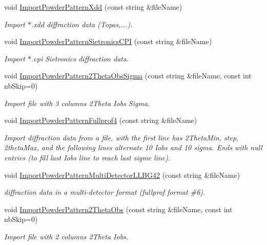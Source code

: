 \begin{DoxyCompactItemize}
void \mbox{\hyperlink{class_obj_cryst_1_1_powder_pattern_a4a8e1dc893c04a4451327d3f48f21d0e}{Import\+Powder\+Pattern\+Xdd}} (const string \&file\+Name)
\begin{DoxyCompactList}\small\item\em Import $\ast$.xdd diffraction data (Topas,...). \end{DoxyCompactList}\item 
void \mbox{\hyperlink{class_obj_cryst_1_1_powder_pattern_adabe6381d8d1189abcf420f69a41cc81}{Import\+Powder\+Pattern\+Sietronics\+C\+PI}} (const string \&file\+Name)
\begin{DoxyCompactList}\small\item\em Import $\ast$.cpi Sietronics diffraction data. \end{DoxyCompactList}\item 
void \mbox{\hyperlink{class_obj_cryst_1_1_powder_pattern_aee56a2f23b8af5c855ceae82c246f242}{Import\+Powder\+Pattern2\+Theta\+Obs\+Sigma}} (const string \&file\+Name, const int nb\+Skip=0)
\begin{DoxyCompactList}\small\item\em Import file with 3 columns 2Theta Iobs Sigma. \end{DoxyCompactList}\item 
void \mbox{\hyperlink{class_obj_cryst_1_1_powder_pattern_a272b9fd71a6925eb9e1a991e488259b4}{Import\+Powder\+Pattern\+Fullprof4}} (const string \&file\+Name)
\begin{DoxyCompactList}\small\item\em Import diffraction data from a file, with the first line has 2Theta\+Min, step, 2theta\+Max, and the following lines alternate 10 Iobs and 10 sigma. Ends with null entries (to fill last Iobs line to reach last sigme line). \end{DoxyCompactList}\item 
void \mbox{\hyperlink{class_obj_cryst_1_1_powder_pattern_abfc7890a1853583957284fc1a2644855}{Import\+Powder\+Pattern\+Multi\+Detector\+L\+L\+B\+G42}} (const string \&file\+Name)
\begin{DoxyCompactList}\small\item\em diffraction data in a multi-\/detector format (fullprof format \#6). \end{DoxyCompactList}\item 
void \mbox{\hyperlink{class_obj_cryst_1_1_powder_pattern_a1c817b8e20b03b216323933e01e6fb00}{Import\+Powder\+Pattern2\+Theta\+Obs}} (const string \&file\+Name, const int nb\+Skip=0)
\begin{DoxyCompactList}\small\item\em Import file with 2 columns 2Theta Iobs. \end{DoxyCompactList}\item 

\end{DoxyCompactItemize}
